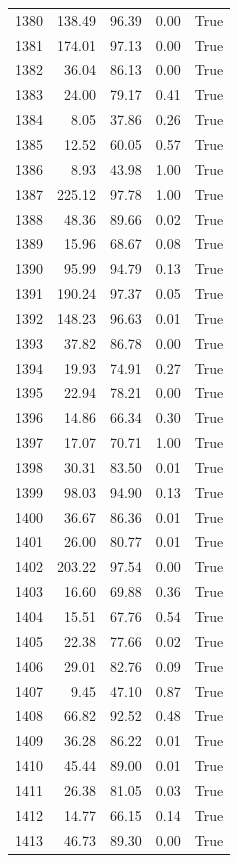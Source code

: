 \begin{longtable}{rrrrr}
1380 & 138.49 & 96.39 & 0.00 & True \\
1381 & 174.01 & 97.13 & 0.00 & True \\
1382 & 36.04 & 86.13 & 0.00 & True \\
1383 & 24.00 & 79.17 & 0.41 & True \\
1384 & 8.05 & 37.86 & 0.26 & True \\
1385 & 12.52 & 60.05 & 0.57 & True \\
1386 & 8.93 & 43.98 & 1.00 & True \\
1387 & 225.12 & 97.78 & 1.00 & True \\
1388 & 48.36 & 89.66 & 0.02 & True \\
1389 & 15.96 & 68.67 & 0.08 & True \\
1390 & 95.99 & 94.79 & 0.13 & True \\
1391 & 190.24 & 97.37 & 0.05 & True \\
1392 & 148.23 & 96.63 & 0.01 & True \\
1393 & 37.82 & 86.78 & 0.00 & True \\
1394 & 19.93 & 74.91 & 0.27 & True \\
1395 & 22.94 & 78.21 & 0.00 & True \\
1396 & 14.86 & 66.34 & 0.30 & True \\
1397 & 17.07 & 70.71 & 1.00 & True \\
1398 & 30.31 & 83.50 & 0.01 & True \\
1399 & 98.03 & 94.90 & 0.13 & True \\
1400 & 36.67 & 86.36 & 0.01 & True \\
1401 & 26.00 & 80.77 & 0.01 & True \\
1402 & 203.22 & 97.54 & 0.00 & True \\
1403 & 16.60 & 69.88 & 0.36 & True \\
1404 & 15.51 & 67.76 & 0.54 & True \\
1405 & 22.38 & 77.66 & 0.02 & True \\
1406 & 29.01 & 82.76 & 0.09 & True \\
1407 & 9.45 & 47.10 & 0.87 & True \\
1408 & 66.82 & 92.52 & 0.48 & True \\
1409 & 36.28 & 86.22 & 0.01 & True \\
1410 & 45.44 & 89.00 & 0.01 & True \\
1411 & 26.38 & 81.05 & 0.03 & True \\
1412 & 14.77 & 66.15 & 0.14 & True \\
1413 & 46.73 & 89.30 & 0.00 & True \\

\end{longtable}
